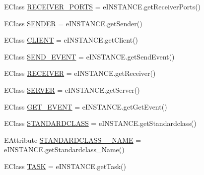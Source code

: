 \begin{DoxyCompactItemize}
\item 
E\-Class \hyperlink{interfaceshootingmachineemfmodel_1_1_shootingmachineemfmodel_package_1_1_literals_a8a2c5b058053298e29f461c04c2f077e}{R\-E\-C\-E\-I\-V\-E\-R\-\_\-\-P\-O\-R\-T\-S} = e\-I\-N\-S\-T\-A\-N\-C\-E.\-get\-Receiver\-Ports()
\item 
E\-Class \hyperlink{interfaceshootingmachineemfmodel_1_1_shootingmachineemfmodel_package_1_1_literals_aa357d1c04e9e4b8441204c409714c446}{S\-E\-N\-D\-E\-R} = e\-I\-N\-S\-T\-A\-N\-C\-E.\-get\-Sender()
\item 
E\-Class \hyperlink{interfaceshootingmachineemfmodel_1_1_shootingmachineemfmodel_package_1_1_literals_a94f1cf9078e7f24c78b992d0e1212708}{C\-L\-I\-E\-N\-T} = e\-I\-N\-S\-T\-A\-N\-C\-E.\-get\-Client()
\item 
E\-Class \hyperlink{interfaceshootingmachineemfmodel_1_1_shootingmachineemfmodel_package_1_1_literals_a317aabab1ec23d18b8de6dd458f47caa}{S\-E\-N\-D\-\_\-\-E\-V\-E\-N\-T} = e\-I\-N\-S\-T\-A\-N\-C\-E.\-get\-Send\-Event()
\item 
E\-Class \hyperlink{interfaceshootingmachineemfmodel_1_1_shootingmachineemfmodel_package_1_1_literals_a50715f2844adcd5662cb7927a77a688a}{R\-E\-C\-E\-I\-V\-E\-R} = e\-I\-N\-S\-T\-A\-N\-C\-E.\-get\-Receiver()
\item 
E\-Class \hyperlink{interfaceshootingmachineemfmodel_1_1_shootingmachineemfmodel_package_1_1_literals_a1036dfbc9612abd79064026db37b0a33}{S\-E\-R\-V\-E\-R} = e\-I\-N\-S\-T\-A\-N\-C\-E.\-get\-Server()
\item 
E\-Class \hyperlink{interfaceshootingmachineemfmodel_1_1_shootingmachineemfmodel_package_1_1_literals_a33cdd3a6ccbe45b441e89418a368043f}{G\-E\-T\-\_\-\-E\-V\-E\-N\-T} = e\-I\-N\-S\-T\-A\-N\-C\-E.\-get\-Get\-Event()
\item 
E\-Class \hyperlink{interfaceshootingmachineemfmodel_1_1_shootingmachineemfmodel_package_1_1_literals_a11dc8cd59d7a5eb2014c42a630a5146e}{S\-T\-A\-N\-D\-A\-R\-D\-C\-L\-A\-S\-S} = e\-I\-N\-S\-T\-A\-N\-C\-E.\-get\-Standardclass()
\item 
E\-Attribute \hyperlink{interfaceshootingmachineemfmodel_1_1_shootingmachineemfmodel_package_1_1_literals_aa9fb7c83a73b8783944eaf8463d2626f}{S\-T\-A\-N\-D\-A\-R\-D\-C\-L\-A\-S\-S\-\_\-\-\_\-\-N\-A\-M\-E} = e\-I\-N\-S\-T\-A\-N\-C\-E.\-get\-Standardclass\-\_\-\-Name()
\item 
E\-Class \hyperlink{interfaceshootingmachineemfmodel_1_1_shootingmachineemfmodel_package_1_1_literals_ac7af0c94116439dc2bbf03b03620d74e}{T\-A\-S\-K} = e\-I\-N\-S\-T\-A\-N\-C\-E.\-get\-Task()

\end{DoxyCompactItemize}
